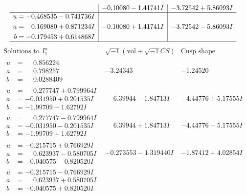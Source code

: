 \documentclass[1p]{elsarticle_modified}
\theoremstyle{definition}
\newcommand{\I}{\sqrt{-1}}
\begin{document}
$$\begin{array}{c|c|c}
 & -0.10080 - 1.41741 I & -3.72542 + 5.86093 I \\ \hline\begin{aligned}
u &= -0.468535 - 0.741736 I \\
a &= \phantom{-}0.169080 + 0.871234 I \\
b &= -0.179453 + 0.614868 I\end{aligned}
 & -0.10080 + 1.41741 I & -3.72542 - 5.86093 I\\
 \hline 
 \end{array}$$\newpage$$\begin{array}{c|c|c}  
\text{Solutions to }I^u_{1}& \I (\text{vol} + \sqrt{-1}CS) & \text{Cusp shape}\\
 \hline 
\begin{aligned}
u &= \phantom{-}0.856224\phantom{ +0.000000I} \\
a &= \phantom{-}0.798257\phantom{ +0.000000I} \\
b &= \phantom{-}0.0288409\phantom{ +0.000000I}\end{aligned}
 & -3.24343\phantom{ +0.000000I} & -1.24520\phantom{ +0.000000I} \\ \hline\begin{aligned}
u &= \phantom{-}0.277747 + 0.799964 I \\
a &= -0.031950 + 0.201535 I \\
b &= -1.99709 - 1.62792 I\end{aligned}
 & \phantom{-}6.39944 - 1.84713 I & -4.44776 + 5.17555 I \\ \hline\begin{aligned}
u &= \phantom{-}0.277747 - 0.799964 I \\
a &= -0.031950 - 0.201535 I \\
b &= -1.99709 + 1.62792 I\end{aligned}
 & \phantom{-}6.39944 + 1.84713 I & -4.44776 - 5.17555 I \\ \hline\begin{aligned}
u &= -0.215715 + 0.766929 I \\
a &= \phantom{-}0.623937 - 0.580705 I \\
b &= -0.040575 - 0.820520 I\end{aligned}
 & -0.273553 - 1.319440 I & -1.87412 + 4.02854 I \\ \hline\begin{aligned}
u &= -0.215715 - 0.766929 I \\
a &= \phantom{-}0.623937 + 0.580705 I \\
b &= -0.040575 + 0.820520 I\end{aligned}

\end{array}$$
\end{document}
